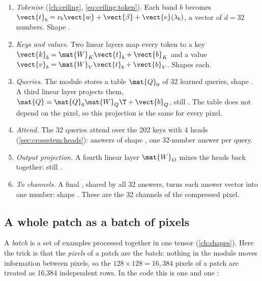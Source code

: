 \begin{enumerate}
\item \emph{Tokenise} (\cref{ch:ceiling}, \cref{eq:ceiling:token}). Each band $b$ becomes $\vect{t}_b = v_b\vect{w} + \vect{\beta} + \vect{e}(\lambda_b)$, a vector of $d = 32$ numbers. Shape .
\item \emph{Keys and values.} Two linear layers map every token to a key $\vect{k}_b = \mat{W}_K\vect{t}_b + \vect{b}_K$ and a value $\vect{v}_b = \mat{W}_V\vect{t}_b + \vect{b}_V$. Shapes  each.
\item \emph{Queries.} The module stores a table $\mat{Q}_0$ of 32 learned queries, shape . A third linear layer projects them, $\mat{Q} = \mat{Q}_0\mat{W}_Q\T + \vect{b}_Q$, still . The table does not depend on the pixel, so this projection is the same for every pixel.
\item \emph{Attend.} The 32 queries attend over the 202 keys with 4 heads (\cref{sec:crossstem:heads}): answers of shape , one 32-number answer per query.
\item \emph{Output projection.} A fourth linear layer $\mat{W}_O$ mixes the heads back together: still .
\item \emph{To channels.} A final , shared by all 32 answers, turns each answer vector into one number: shape . These are the 32 channels of the compressed pixel.
\end{enumerate}


\subsection{A whole patch as a batch of pixels}

A \emph{batch} is a set of examples processed together in one tensor (\cref{ch:shapes}). Here the trick is that the \emph{pixels} of a patch are the batch: nothing in the module moves information between pixels, so the $128\times128 = 16{,}384$ pixels of a patch are treated as 16,384 independent rows. In the code this is one  and one :


